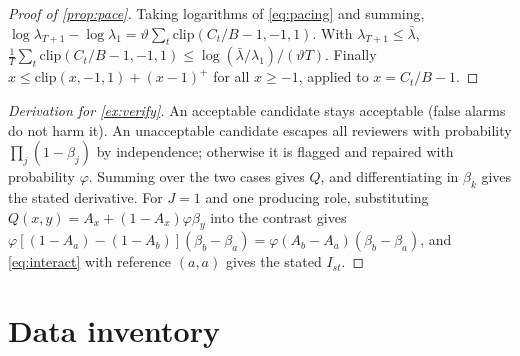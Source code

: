 \documentclass[11pt,a4paper]{article}
\theoremstyle{definition}
\theoremstyle{remark}
\theoremstyle{definition}
\begin{document}
\begin{proof}[Proof of \cref{prop:pace}]
Taking logarithms of \eqref{eq:pacing} and summing, $\log\lambda_{T+1}-\log\lambda_1=\vartheta\sum_t\mathrm{clip}(C_t/B-1,-1,1)$. With $\lambda_{T+1}\le\bar\lambda$, $\frac1T\sum_t\mathrm{clip}(C_t/B-1,-1,1)\le\log(\bar\lambda/\lambda_1)/(\vartheta T)$. Finally $x\le\mathrm{clip}(x,-1,1)+(x-1)^+$ for all $x\ge-1$, applied to $x=C_t/B-1$.
\end{proof}

\begin{proof}[Derivation for \cref{ex:verify}]
An acceptable candidate stays acceptable (false alarms do not harm it). An unacceptable candidate escapes all reviewers with probability $\prod_j(1-\beta_j)$ by independence; otherwise it is flagged and repaired with probability $\varphi$. Summing over the two cases gives $Q$, and differentiating in $\beta_k$ gives the stated derivative. For $J=1$ and one producing role, substituting $Q(x,y)=A_x+(1-A_x)\varphi\beta_y$ into the contrast gives $\varphi[(1-A_a)-(1-A_b)](\beta_b-\beta_a)=\varphi(A_b-A_a)(\beta_b-\beta_a)$, and \eqref{eq:interact} with reference $(a,a)$ gives the stated $I_{st}$.
\end{proof}

\section{Data inventory}
\label{app:data}
\end{document}
